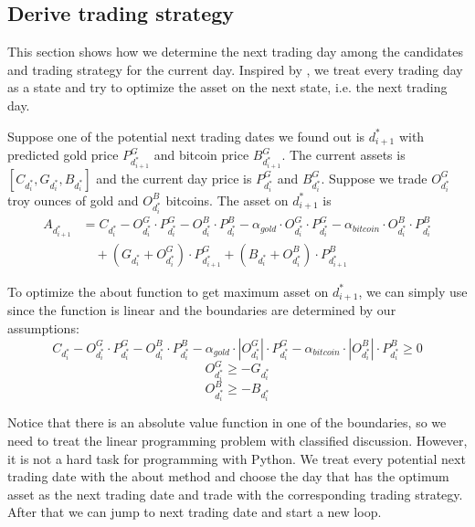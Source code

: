 \documentclass{mcmthesis}
\begin{document}
\subsection{Derive trading strategy}\label{derive next trading day}
This section shows how we determine the next trading day among the candidates and trading strategy for the current day. Inspired by , we treat every trading day as a state and try to optimize the asset on the next state, i.e. the next trading day. 


Suppose one of the potential next trading dates we found out is $d^*_{i+1}$ with predicted gold price $P^G_{d^*_{i+1}}$ and bitcoin price $B^G_{d^*_{i+1}}$. The current assets is $[C_{d^*_{i}}, G_{d^*_{i}}, B_{d^*_{i}}]$ and the current day price is $P^G_{d^*_{i}}$ and $B^G_{d^*_{i}}$. Suppose we trade $O^G_{d^*_i}$ troy ounces of gold and $O^B_{d^*_i}$ bitcoins. The asset on $d^*_{i+1}$ is
\begin{equation}
\begin{aligned}
A_{d^*_{i+1}} &= C_{d^*_{i}} - O^G_{d^*_i} · P^G_{d^*_{i}} - O^B_{d^*_i}·P^B_{d^*_{i}} - \alpha_{gold}·O^G_{d^*_i}·P^G_{d^*_{i}}  - \alpha_{bitcoin}·O^B_{d^*_i}·P^B_{d^*_{i}} \\ 
& \quad + (G_{d^*_{i}} + O^G_{d^*_i})·P^G_{d^*_{i+1}} + (B_{d^*_{i}} + O^B_{d^*_i})·P^B_{d^*_{i+1}}
\end{aligned}
\end{equation}


To optimize the about function to get maximum asset on $d^*_{i+1}$, we can simply use  since the function is linear and the boundaries are determined by our assumptions:
\begin{equation}
        C_{d^*_{i}} - O^G_{d^*_i} · P^G_{d^*_{i}} - O^B_{d^*_i}·P^B_{d^*_{i}} - \alpha_{gold}·|O^G_{d^*_i}|·P^G_{d^*_{i}} - \alpha_{bitcoin}·|O^B_{d^*_i}|·P^B_{d^*_{i}} \geq 0 
\end{equation}
\begin{equation}
    O^G_{d^*_i} \geq -G_{d^*_{i}}
\end{equation}
\begin{equation}
    O^B_{d^*_i} \geq -B_{d^*_{i}}
\end{equation}


Notice that there is an absolute value function in one of the boundaries, so we need to treat the linear programming problem with classified discussion. However, it is not a hard task for programming with Python. We treat every potential next trading date with the about method and choose the day that has the optimum asset as the next trading date and trade with the corresponding trading strategy. After that we can jump to next trading date and start a new loop.
\end{document}
